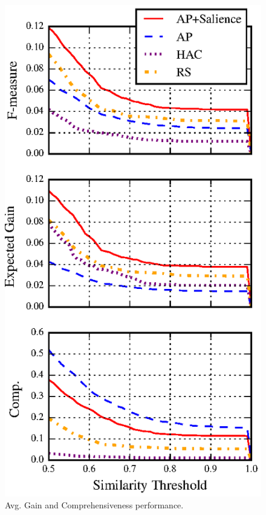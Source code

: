 \begin{figure}
  \includegraphics[]{nuggets-metrics.eps}
\caption{Avg. Gain and Comprehensiveness performance.}
\label{fig:nperf}
\end{figure}

